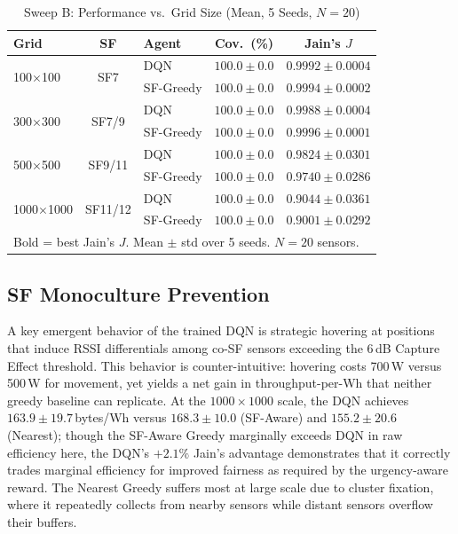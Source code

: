 \documentclass[conference]{IEEEtran}
\begin{document}
\begin{table}[htbp]
\caption{Sweep B: Performance vs.\ Grid Size (Mean, 5 Seeds, $N = 20$)}
\begin{center}
\begin{tabular}{|l|c|l|c|c|}
\hline
\textbf{Grid} & \textbf{SF} & \textbf{Agent} & \textbf{Cov.\ (\%)} & \textbf{Jain's $J$} \\
\hline
\multirow{2}{*}{100$\times$100}  & \multirow{2}{*}{SF7}
  & DQN       & $100.0\pm0.0$ & $\mathbf{0.9992\pm0.0004}$ \\
  && SF-Greedy & $100.0\pm0.0$ & $0.9994\pm0.0002$ \\
\hline
\multirow{2}{*}{300$\times$300}  & \multirow{2}{*}{SF7/9}
  & DQN       & $100.0\pm0.0$ & $\mathbf{0.9988\pm0.0004}$ \\
  && SF-Greedy & $100.0\pm0.0$ & $0.9996\pm0.0001$ \\
\hline
\multirow{2}{*}{500$\times$500}  & \multirow{2}{*}{SF9/11}
  & DQN       & $100.0\pm0.0$ & $\mathbf{0.9824\pm0.0301}$ \\
  && SF-Greedy & $100.0\pm0.0$ & $0.9740\pm0.0286$ \\
\hline
\multirow{2}{*}{1000$\times$1000} & \multirow{2}{*}{SF11/12}
  & DQN       & $100.0\pm0.0$ & $\mathbf{0.9044\pm0.0361}$ \\
  && SF-Greedy & $100.0\pm0.0$ & $0.9001\pm0.0292$ \\
\hline
\multicolumn{5}{l}{\footnotesize Bold = best Jain's $J$. Mean $\pm$ std over 5 seeds. $N=20$ sensors.}
\end{tabular}
\label{tab:sweepB}
\end{center}
\end{table}

\subsection{SF Monoculture Prevention}

A key emergent behavior of the trained DQN is strategic hovering at positions that induce RSSI differentials among co-SF sensors exceeding the 6\,dB Capture Effect threshold. This behavior is counter-intuitive: hovering costs 700\,W versus 500\,W for movement, yet yields a net gain in throughput-per-Wh that neither greedy baseline can replicate. At the $1000\times1000$ scale, the DQN achieves $163.9\pm19.7$\,bytes/Wh versus $168.3\pm10.0$ (SF-Aware) and $155.2\pm20.6$ (Nearest); though the SF-Aware Greedy marginally exceeds DQN in raw efficiency here, the DQN's $+2.1\%$ Jain's advantage demonstrates that it correctly trades marginal efficiency for improved fairness as required by the urgency-aware reward. The Nearest Greedy suffers most at large scale due to cluster fixation, where it repeatedly collects from nearby sensors while distant sensors overflow their buffers.
\end{document}
